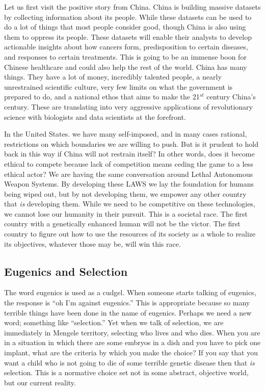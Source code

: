 Let us first visit the positive story from China.
China is building massive datasets by collecting information about its people.
While these datasets can be used to do a lot of things that most people consider good, though China is also using them to oppress its people.
These datasets will enable their analysts to develop actionable insights about how cancers form, predisposition to certain diseases, and responses to certain treatments.
This is going to be an immense boon for Chinese healthcare and could also help the rest of the world.
China has many things.
They have a lot of money, incredibly talented people, a nearly unrestrained scientific culture, very few limits on what the government is prepared to do, and a national ethos that aims to make the 21$^{st}$ century China's century.
These are translating into very aggressive applications of revolutionary science with biologists and data scientists at the forefront.

In the United States. we have many self-imposed, and in many cases rational, restrictions on which boundaries we are willing to push.
But is it prudent to hold back in this way if China will not restrain itself?
In other words, does it become ethical to compete because lack of competition means ceding the game to a less ethical actor?
We are having the same conversation around Lethal Autonomous Weapon Systems.
By developing these LAWS we lay the foundation for humans being wiped out, but by not developing them, we empower any other country that \textit{is} developing them.
While we need to be competitive on these technologies, we cannot lose our humanity in their pursuit.
This is a societal race.
The first country with a genetically enhanced human will not be the victor.
The first country to figure out how to use the resources of its society as a whole to realize its objectives, whatever those may be, will win this race.

\subsection{Eugenics and Selection}

The word eugenics is used as a cudgel.
When someone starts talking of eugenics, the response is ``oh I'm against eugenics.''
This is appropriate because so many terrible things have been done in the name of eugenics.
Perhaps we need a new word; something like ``selection.''
Yet when we talk of selection, we are immediately in Mengele territory, selecting who lives and who dies.
When you are in a situation in which there are some embryos in a dish and you have to pick one implant, what are the criteria by which you make the choice?
If you say that you want a child who is not going to die of some terrible genetic disease then that \textit{is} selection.
This is a normative choice set not in some abstract, objective world, but our current reality.

